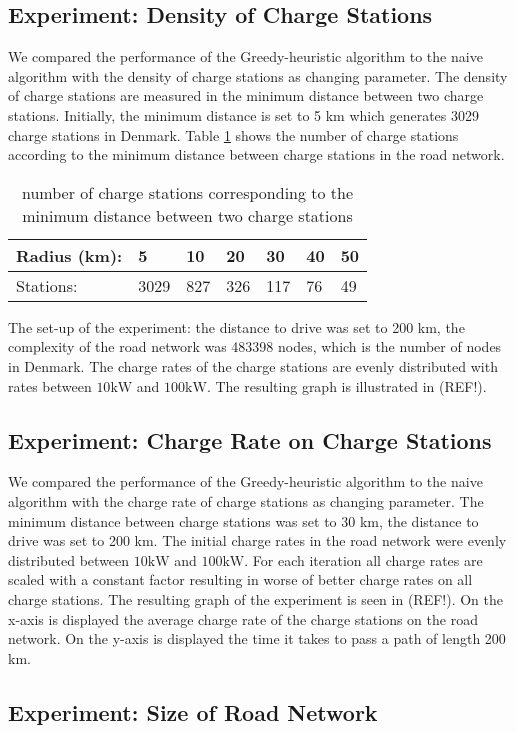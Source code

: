 \subsection{Experiment: Density of Charge Stations}

We compared the performance of the Greedy-heuristic algorithm to the naive algorithm with the density of charge stations as changing parameter. The
density of charge stations are measured in the minimum distance between two charge stations. Initially, the minimum distance is set to 5 km which generates 3029 charge stations in Denmark. Table \ref{table:chargedensity} shows the number of charge stations according to the minimum distance between charge stations in the road network.

\begin{table}[!htb]
\centering
		\begin{tabular}{ p{1.85cm} p{0.67cm} p{0.63cm} p{0.63cm} p{0.63cm} p{0.63cm} p{0.63cm} } \hline
		Radius (km): & 5 & 10 & 20 & 30 & 40 & 50 \\ \hline
		Stations: & 3029 & 827 & 326 & 117 & 76 & 49 \\ \hline 
		\end{tabular}
		\caption{number of charge stations corresponding to the minimum distance between two charge stations}
	\label{table:chargedensity}
	\end{table}

The set-up of the experiment: the distance to drive was set to 200 km, the complexity of the road network was 483398 nodes, which is the number of nodes in Denmark. The charge rates of the charge stations are evenly distributed with rates between $10 \si{\kW}$ and $100 \si{\kW}$. The resulting graph is illustrated in (REF!).

\subsection{Experiment: Charge Rate on Charge Stations}

We compared the performance of the Greedy-heuristic algorithm to the naive algorithm with the charge rate of charge stations as changing parameter. The minimum distance between charge stations was set to 30 km, the distance to drive was set to 200 km. The initial charge rates in the road network were evenly distributed between $10 \si{\kW}$ and $100 \si{\kW}$. For each iteration all charge rates are scaled with a constant factor resulting in worse of better charge rates on all charge stations. The resulting graph of the experiment is seen in (REF!). On the x-axis is displayed the average charge rate of the charge stations on the road network. On the y-axis is displayed the time it takes to pass a path of length 200 km. 

\subsection{Experiment: Size of Road Network}


